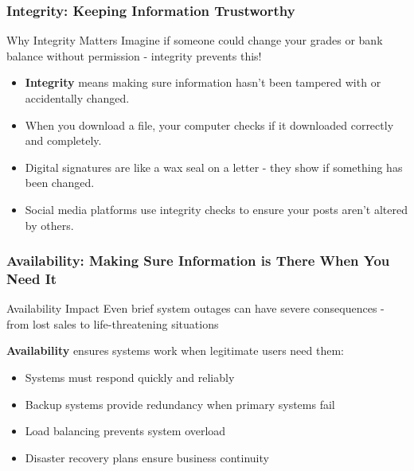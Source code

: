 \documentclass{beamer}
\begin{document}
\begin{frame}
    \frametitle{Integrity: Keeping Information Trustworthy}
    \begin{block}{Why Integrity Matters}
        Imagine if someone could change your grades or bank balance without permission - integrity prevents this!
    \end{block}
    \begin{itemize}
        \item \textbf{Integrity} means making sure information hasn't been tampered with or accidentally changed.
        \item When you download a file, your computer checks if it downloaded correctly and completely.
        \item Digital signatures are like a wax seal on a letter - they show if something has been changed.
        \item Social media platforms use integrity checks to ensure your posts aren't altered by others.
    \end{itemize}
\end{frame}

\begin{frame}
    \frametitle{Availability: Making Sure Information is There When You Need It}
    \begin{alertblock}{Availability Impact}
        Even brief system outages can have severe consequences - from lost sales to life-threatening situations
    \end{alertblock}
    
    \textbf{Availability} ensures systems work when legitimate users need them:
    \begin{itemize}
        \item Systems must respond quickly and reliably
        \item Backup systems provide redundancy when primary systems fail
        \item Load balancing prevents system overload
        \item Disaster recovery plans ensure business continuity
    \end{itemize}
\end{frame}
\end{document}
